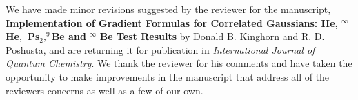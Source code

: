 \documentclass[12pt]{article}
\begin{document}
\begin{letteropening}
\end{letteropening}

We have made minor revisions suggested by the reviewer for the manuscript, 
\textbf{Implementation of Gradient Formulas for Correlated Gaussians: He, }$%
^\infty $\textbf{He},\textbf{\ Ps}$_2,^9$\textbf{Be and }$^\infty $\textbf{%
Be Test Results} by Donald B. Kinghorn and R. D. Poshusta, and are returning
it for publication in \emph{International Journal of Quantum Chemistry}. We
thank the reviewer for his comments and have taken the opportunity to make
improvements in the manuscript that address all of the reviewers concerns as
well as a few of our own.
\end{document}
